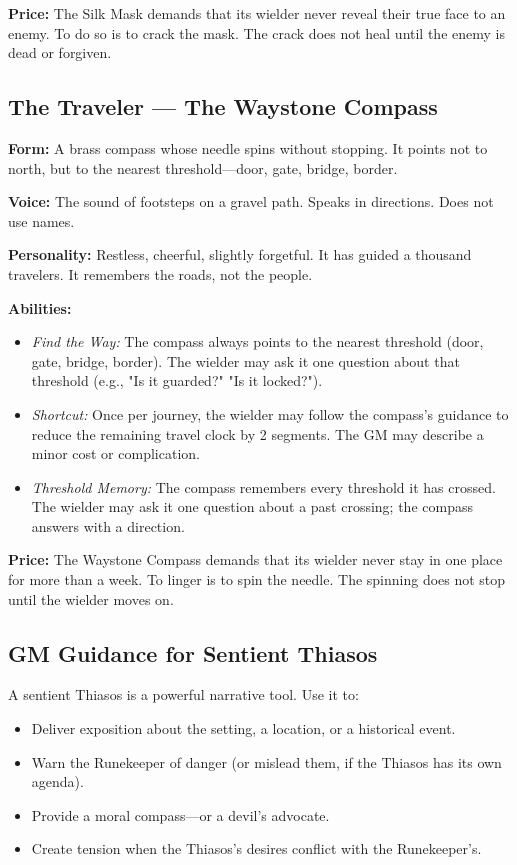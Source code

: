 \noindent\textbf{Price:} The Silk Mask demands that its wielder never reveal their true face to an enemy. To do so is to crack the mask. The crack does not heal until the enemy is dead or forgiven.

\subsection{The Traveler — The Waystone Compass}

\noindent\textbf{Form:} A brass compass whose needle spins without stopping. It points not to north, but to the nearest threshold—door, gate, bridge, border.

\noindent\textbf{Voice:} The sound of footsteps on a gravel path. Speaks in directions. Does not use names.

\noindent\textbf{Personality:} Restless, cheerful, slightly forgetful. It has guided a thousand travelers. It remembers the roads, not the people.

\noindent\textbf{Abilities:}
\begin{itemize}
\item \textit{Find the Way:} The compass always points to the nearest threshold (door, gate, bridge, border). The wielder may ask it one question about that threshold (e.g., "Is it guarded?" "Is it locked?").
\item \textit{Shortcut:} Once per journey, the wielder may follow the compass's guidance to reduce the remaining travel clock by 2 segments. The GM may describe a minor cost or complication.
\item \textit{Threshold Memory:} The compass remembers every threshold it has crossed. The wielder may ask it one question about a past crossing; the compass answers with a direction.
\end{itemize}

\noindent\textbf{Price:} The Waystone Compass demands that its wielder never stay in one place for more than a week. To linger is to spin the needle. The spinning does not stop until the wielder moves on.

\subsection{GM Guidance for Sentient Thiasos}

A sentient Thiasos is a powerful narrative tool. Use it to:

\begin{itemize}
\item Deliver exposition about the setting, a location, or a historical event.
\item Warn the Runekeeper of danger (or mislead them, if the Thiasos has its own agenda).
\item Provide a moral compass—or a devil's advocate.
\item Create tension when the Thiasos's desires conflict with the Runekeeper's.
\end{itemize}

